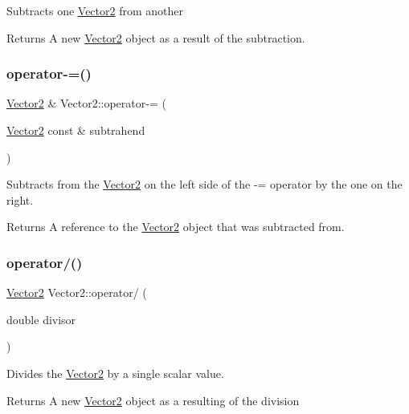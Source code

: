 Subtracts one \hyperlink{structVector2}{Vector2} from another

\begin{DoxyReturn}{Returns}
A new \hyperlink{structVector2}{Vector2} object as a result of the subtraction. 
\end{DoxyReturn}
\mbox{\label{structVector2_a32660b671e4f349d8c800d9b7532478a}} 
\subsubsection{\texorpdfstring{operator-\/=()}{operator-=()}}
{\footnotesize\ttfamily \hyperlink{structVector2}{Vector2} \& Vector2\+::operator-\/= (\begin{DoxyParamCaption}\item[{\hyperlink{structVector2}{Vector2} const \&}]{subtrahend }\end{DoxyParamCaption})}

Subtracts from the \hyperlink{structVector2}{Vector2} on the left side of the -\/= operator by the one on the right.

\begin{DoxyReturn}{Returns}
A reference to the \hyperlink{structVector2}{Vector2} object that was subtracted from. 
\end{DoxyReturn}
\mbox{\label{structVector2_af1f28daf513fd4ac8c35b01a9b35ea62}} 
\subsubsection{\texorpdfstring{operator/()}{operator/()}}
{\footnotesize\ttfamily \hyperlink{structVector2}{Vector2} Vector2\+::operator/ (\begin{DoxyParamCaption}\item[{double}]{divisor }\end{DoxyParamCaption})}

Divides the \hyperlink{structVector2}{Vector2} by a single scalar value.

\begin{DoxyReturn}{Returns}
A new \hyperlink{structVector2}{Vector2} object as a resulting of the division 
\end{DoxyReturn}
\mbox{\label{structVector2_a5d78350983e3b01a226600a498be077e}} 
